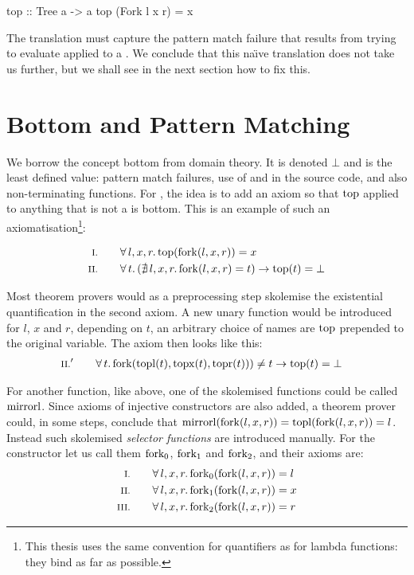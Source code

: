 \begin{code}
top :: Tree a -> a
top (Fork l x r) = x
\end{code}

The translation must capture the pattern match failure that results
from trying to evaluate  applied to a . We conclude
that this na\"{\i}ve translation does not take us further, but we
shall see in the next section how to fix this.

\section{Bottom and Pattern Matching}

We borrow the concept bottom from domain theory. It is denoted
$\bot$ and is the least defined value: pattern match failures, use of
 and  in the source code, and also
non-terminating functions. For , the idea is to add an axiom
so that $\mathrm{top}$ applied to anything that is not a  is
bottom. This is an example of such an axiomatisation\footnote{This
  thesis uses the same convention for quantifiers as for lambda
  functions: they bind as far as possible.}:

\begin{align*}
\rom{1} \qquad & \faaa{l}{x}{r} \fn{top}(\fn{fork}(l,x,r)) \eq x \\
\rom{2} \qquad & \fa{t}         (\nexxx{l}{x}{r} \fn{fork}(l,x,r) \eq t) \rightarrow \fn{top}(t) \eq \bot
\end{align*}

Most theorem provers would as a preprocessing step skolemise the existential quantification in the second
axiom. A new unary function would be introduced for $l$, $x$ and $r$,
depending on $t$, an arbitrary choice of names are $\mathrm{top}$ prepended
to the original variable. The axiom then looks like
this:
\begin{align*}
\rom{2}' \qquad & \fa{t} \fn{fork}(\fn{topl}(t),\fn{topx}(t),\fn{topr}(t))) \neq t \rightarrow \fn{top}(t) \eq \bot
\end{align*}

For another function, like  above, one of the skolemised
functions could be called $\mathrm{mirrorl}$. Since axioms of injective
constructors are also added, a theorem prover could, in some steps,
conclude that $\mathrm{mirrorl}(\mathrm{fork}(l,x,r)) =
\mathrm{topl}(\mathrm{fork}(l,x,r)) = l$. Instead such skolemised
\emph{selector functions} are introduced manually.  For the 
constructor let us call them $\mathrm{fork_0}$, $\mathrm{fork_1}$ and
$\mathrm{fork_2}$, and their axioms are:
\begin{align*}
\rom{1} \qquad \faaa{l}{x}{r} \fn{fork_{0}}(\fn{fork}(l,x,r)) & \eq l \\
\rom{2} \qquad \faaa{l}{x}{r} \fn{fork_{1}}(\fn{fork}(l,x,r)) & \eq x \\
\rom{3} \qquad \faaa{l}{x}{r} \fn{fork_{2}}(\fn{fork}(l,x,r)) & \eq r
\end{align*}

